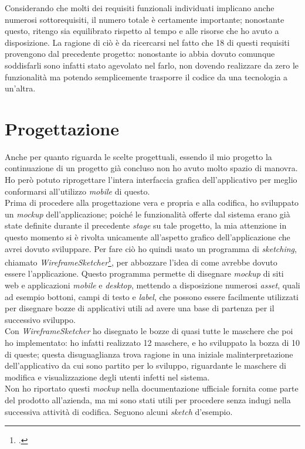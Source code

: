 Considerando che molti dei requisiti funzionali individuati implicano anche numerosi sottorequisiti, il numero totale è certamente importante; nonostante questo, ritengo sia equilibrato rispetto al tempo e alle risorse che ho avuto a disposizione. La ragione di ciò è da ricercarsi nel fatto che 18 di questi requisiti provengono dal precedente progetto: nonostante io abbia dovuto comunque soddisfarli sono infatti stato agevolato nel farlo, non dovendo realizzare da zero le funzionalità ma potendo semplicemente trasporre il codice da una tecnologia a un'altra.


\section{Progettazione}

Anche per quanto riguarda le scelte progettuali, essendo il mio progetto la continuazione di un progetto già concluso non ho avuto molto spazio di manovra. Ho però potuto riprogettare l'intera interfaccia grafica dell'applicativo per meglio conformarsi all'utilizzo \textit{mobile} di questo. \\
Prima di procedere alla progettazione vera e propria e alla codifica, ho sviluppato un \textit{mockup} dell'applicazione; poiché le funzionalità offerte dal sistema erano già state definite durante il precedente \textit{stage} su tale progetto, la mia attenzione in questo momento si è rivolta unicamente all'aspetto grafico dell'applicazione che avrei dovuto sviluppare. Per fare ciò ho quindi usato un programma di \textit{sketching}, chiamato \textit{WireframeSketcher}\footcite{tec:wireframesketcher}, per abbozzare l'idea di come avrebbe dovuto essere l'applicazione. Questo programma permette di disegnare \textit{mockup} di siti web e applicazioni \textit{mobile} e \textit{desktop}, mettendo a disposizione numerosi \textit{asset}, quali ad esempio bottoni, campi di testo e \textit{label}, che possono essere facilmente utilizzati per disegnare bozze di applicativi utili ad avere una base di partenza per il successivo sviluppo. \\
Con \textit{WireframeSketcher} ho disegnato le bozze di quasi tutte le maschere che poi ho implementato: ho infatti realizzato 12 maschere, e ho sviluppato la bozza di 10 di queste; questa disuguaglianza trova ragione in una iniziale malinterpretazione dell'applicativo da cui sono partito per lo sviluppo, riguardante le maschere di modifica e visualizzazione degli utenti infetti nel sistema. \\
Non ho riportato questi \textit{mockup} nella documentazione ufficiale fornita come parte del prodotto all'azienda, ma mi sono stati utili per procedere senza indugi nella successiva attività di codifica. Seguono alcuni \textit{sketch} d'esempio. \\

